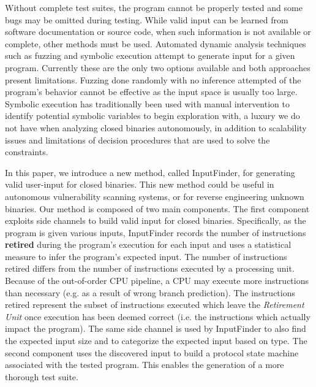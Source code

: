 \documentclass{acm_proc_article-sp}
\def \tool {InputFinder}
\begin{document}
Without complete test suites, the program cannot be properly tested and some bugs may be omitted during testing.
While valid input can be learned from software documentation or source code, when such information is not available or complete, other methods must be used.
Automated dynamic analysis techniques such as fuzzing and symbolic execution attempt to generate input for a given program.
Currently these are the only two options available and both approaches present limitations.
Fuzzing done randomly with no inference attempted of the program's behavior cannot be effective as the input space is usually too large.
Symbolic execution has traditionally been used with manual intervention to identify potential symbolic variables to begin exploration with, a luxury we do not have when analyzing closed binaries autonomously, in addition to scalability issues and limitations of decision procedures that are used to solve the constraints.

In this paper, we introduce a new method, called InputFinder, for generating valid user-input for closed binaries. 
This new method could be useful in autonomous vulnerability scanning systems, or for reverse engineering unknown binaries.
Our method is composed of two main components.
The first component exploits side channels to build valid input for closed binaries.
Specifically, as the program is given various inputs, \tool{} records the number of instructions \textbf{retired} during the program's execution for each input and uses a statistical measure to infer the program's expected input.
The number of instructions retired differs from the number of instructions executed by a processing unit.
Because of the out-of-order CPU pipeline, a CPU may execute more instructions than necessary (e.g. as a result of wrong branch prediction).
The instructions retired represent the subset of instructions executed which leave the \textit{Retirement Unit} once execution has been deemed correct (i.e. the instructions which actually impact the program).
The same side channel is used by \tool{} to also find the expected input size and to categorize the expected input based on type.
The second component uses the discovered input to build a protocol state machine associated with the tested program.
This enables the generation of a more thorough test suite.
\end{document}

